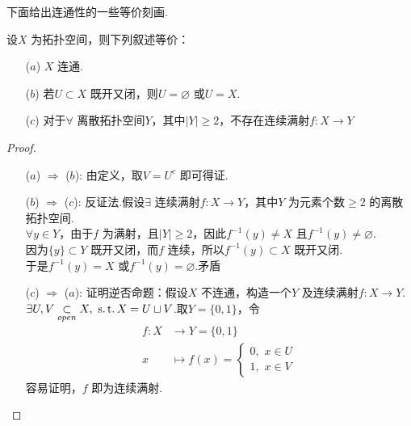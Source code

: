 	\vspace*{2em}
	下面给出连通性的一些等价刻画.
	\begin{proposition}
		设$X$ 为拓扑空间，则下列叙述等价：
		\begin{enumerate}
			\item[($a$)]$X$ 连通.
			
			\item[($b$)]若$U \subset X$ 既开又闭，则$U = \varnothing$ 或$U = X$.
			
			\item[($c$)]对于$\forall$ 离散拓扑空间$Y$，其中$\left| Y \right| \geq 2$，不存在连续满射$f : X \longrightarrow Y$
		\end{enumerate}
	
		\vspace*{2em}
		\begin{proof}
			\begin{enumerate}
				\item[($a$) $\Rightarrow$ ($b$):]由定义，取$V = U^c$ 即可得证.
				
				\item[($b$) $\Rightarrow$ ($c$):]反证法.假设$\exists$ 连续满射$f : X \longrightarrow Y$，其中$Y$ 为元素个数$\geq 2$ 的离散拓扑空间. \\
				$\forall y \in Y$，由于$f$ 为满射，且$\left| Y \right| \geq 2$，因此$f^{-1}(y) \neq X$ 且$f^{-1}(y) \neq \varnothing$.\\
				因为$\{ y \} \subset Y$ 既开又闭，而$f$ 连续，所以$f^{-1}(y) \subset X$ 既开又闭.\\
				于是$f^{-1}(y) = X$ 或$f^{-1}(y) = \varnothing$.矛盾
				
				\item[($c$) $\Rightarrow$ ($a$):]证明逆否命题：假设$X$ 不连通，构造一个$Y$ 及连续满射$f : X \longrightarrow Y$.\\
				$\exists U , V \underset{open}{\subset} X , \,\, \operatorname{s.t.} X = U \sqcup V$.取$Y = \{ 0 , 1 \}$，令
				\begin{align}
					f : X &\longrightarrow Y = \{ 0 , 1 \} \\
					x &\longmapsto f(x) = 
					\begin{cases}
						0 , \,\, x \in U\\
						1 , \,\, x \in V
					\end{cases}
				\end{align}
				容易证明，$f$ 即为连续满射.
			\end{enumerate}
		\end{proof}
	\end{proposition}

